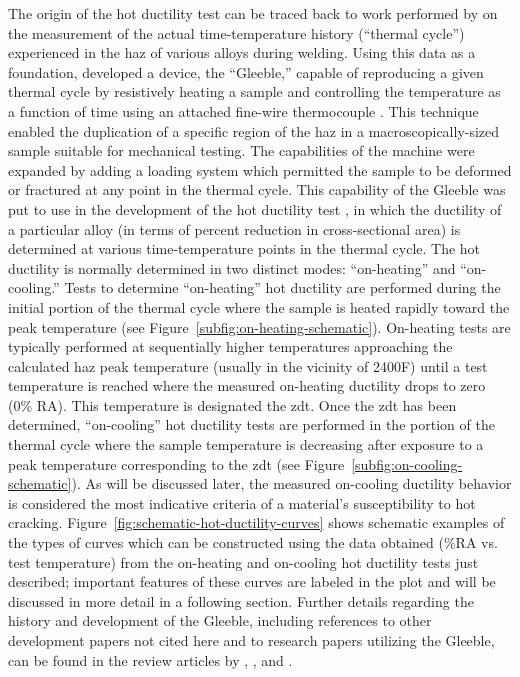 The origin of the hot ductility test can be traced back to work performed by \citet{nippes_cooling_1949} on the measurement of the actual time-temperature history (“thermal cycle”) experienced in the \gls{haz} of various alloys during welding.  Using this data as a foundation, \citeauthor{nippes_development_1949} developed a device, the “Gleeble,” capable of reproducing a given thermal cycle by resistively heating a sample and controlling the temperature as a function of time using an attached fine-wire thermocouple \cite{nippes_development_1949}. This technique enabled the duplication of a specific region of the \gls{haz} in a macroscopically-sized sample suitable for mechanical testing.  The capabilities of the machine were expanded by adding a loading system which permitted the sample to be deformed or fractured at any point in the thermal cycle.  This capability of the Gleeble was put to use in the development of the hot ductility test \cite{nippes_investigation_1955}, in which the ductility of a particular alloy (in terms of percent reduction in cross-sectional area) is determined at various time-temperature points in the thermal cycle.  The hot ductility is normally determined in two distinct modes: “on-heating” and “on-cooling.”  Tests to determine “on-heating” hot ductility are performed during the initial portion of the thermal cycle where the sample is heated rapidly toward the peak temperature (see Figure~\ref{subfig:on-heating-schematic}).  On-heating tests are typically performed at sequentially higher temperatures approaching the calculated \gls{haz} peak temperature (usually in the vicinity of 2400\textdegree{}F) until a test temperature is reached where the measured on-heating ductility drops to zero (0\% RA).  This temperature is designated the \gls{zdt}.  Once the \gls{zdt} has been determined, “on-cooling” hot ductility tests are performed in the portion of the thermal cycle where the sample temperature is decreasing after exposure to a peak temperature corresponding to the \gls{zdt} (see Figure~\ref{subfig:on-cooling-schematic}).  As will be discussed later, the measured on-cooling ductility behavior is considered the most indicative criteria of a material’s susceptibility to hot cracking.  Figure~\ref{fig:schematic-hot-ductility-curves} shows schematic examples of the types of curves which can be constructed using the data obtained (\%RA vs. test temperature) from the on-heating and on-cooling hot ductility tests just described; important features of these curves are labeled in the plot and will be discussed in more detail in a following section. Further details regarding the history and development of the Gleeble, including references to other development papers not cited here and to research papers utilizing the Gleeble, can be found in the review articles by \citet{savage_apparatus_1962}, \citet{lundin_historical_1997}, and \citet{lundin_standardization_1990_history}. 

